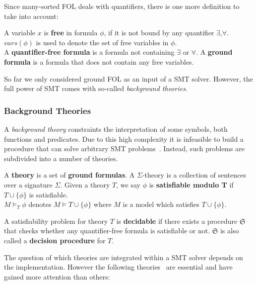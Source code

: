 Since many-sorted FOL deals with quantifiers, there is one more definition to take into account:

\begin{definition}
A variable $x$ is \textbf{free} in formula $\phi$, if it is not bound by any quantifier $\exists$,$\forall$.\\
$vars(\phi)$ is used to denote the set of free variables in $\phi$.\\
A \textbf{quantifier-free formula} is a formula not containing $\exists$ or $\forall$.
A \textbf{ground formula} is a formula that does not contain any free variables.
\end{definition}

So far we only considered ground FOL as an input of a SMT solver. However, the full power of SMT comes with so-called \emph{background theories}. 


\subsubsection*{Background Theories}

A \emph{background theory} constraints the interpretation of some symbols, both functions and predicates. Due to this high complexity it is infeasible to build a procedure that can solve arbitrary SMT problems~\cite{smt-appetizer}. Instead, such problems are subdivided into a number of theories.

\begin{definition}
A \textbf{theory} is a set of \textbf{ground formulas}. A $\Sigma$-theory is a collection of sentences over a signature $\Sigma$. Given a theory $T$, we say $\phi$ is \textbf{satisfiable modulo T} if $T \cup \{\phi\}$ is satisfiable. \\
$M \models_{T} \phi$ denotes $M \models T \cup \{\phi\}$ where $M$ is a model which satisfies $T \cup \{\phi\}$.
\end{definition}



\begin{definition}
A satisfiability problem for theory $T$ is \textbf{decidable} if there exists a procedure $\mathfrak{S}$ that checks whether any quantifier-free formula is satisfiable or not. $\mathfrak{S}$ is also called a \textbf{decision procedure} for $T$.
\end{definition}

The question of which theories are integrated within a SMT solver depends on the implementation. However the following theories~\cite{smt-appetizer} are essential and have gained more attention than others:

